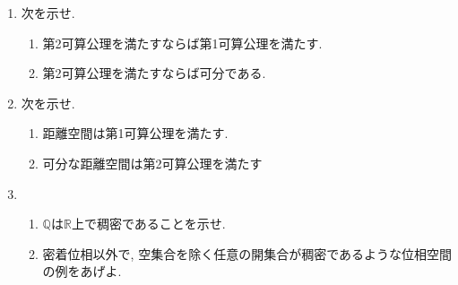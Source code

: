 \documentclass[dvipdfmx,a4paper,11pt]{article}
\newcommand{\R}{\mathbb{R}}
\newcommand{\Q}{\mathbb{Q}}
\theoremstyle{definition}
\begin{document}
\begin{enumerate}[ label=\textbf{問}4.\arabic*]

\item 次を示せ.
	\begin{enumerate}
	\item 第2可算公理を満たすならば第1可算公理を満たす.
	\item 第2可算公理を満たすならば可分である.
	\end{enumerate}

\item 次を示せ.	
	\begin{enumerate}
	\item 距離空間は第1可算公理を満たす.
	\item 可分な距離空間は第2可算公理を満たす
	\end{enumerate}

	
\item  %
	\begin{enumerate}
	\item $\Q$は$\R$上で稠密であることを示せ.
	\item 密着位相以外で, 空集合を除く任意の開集合が稠密であるような位相空間の例をあげよ.
	\end{enumerate}
	

\end{enumerate}
\end{document}
